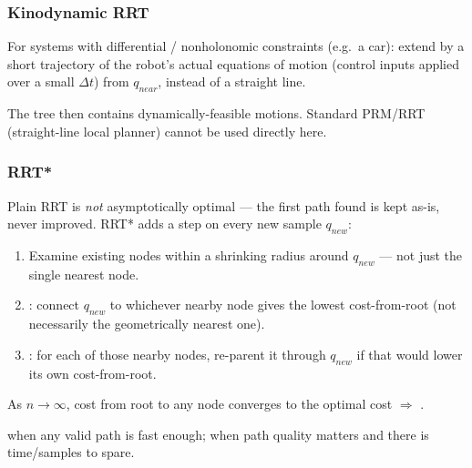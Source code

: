\begin{democallout}
\end{democallout}

\subsubsection{Kinodynamic RRT}
For systems with differential / nonholonomic constraints (e.g.\ a car): extend by  a short trajectory of the robot's actual equations of motion (control inputs applied over a small $\Delta t$) from $q_{near}$, instead of a straight line.

The tree then contains dynamically-feasible motions. Standard PRM/RRT (straight-line local planner) cannot be used directly here.

\subsubsection{RRT*}
Plain RRT is \emph{not} asymptotically optimal — the first path found is kept as-is, never improved. RRT* adds a  step on every new sample $q_{new}$:
\begin{enumerate}
\item Examine existing nodes within a shrinking radius around $q_{new}$ — not just the single nearest node.
\item {}: connect $q_{new}$ to whichever nearby node gives the lowest cost-from-root (not necessarily the geometrically nearest one).
\item {}: for each of those nearby nodes, re-parent it through $q_{new}$ if that would lower its own cost-from-root.
\end{enumerate}
As $n\to\infty$, cost from root to any node converges to the optimal cost $\Rightarrow$ .

 when any valid path is fast enough;  when path quality matters and there is time/samples to spare.
\begin{democallout}
\end{democallout}

